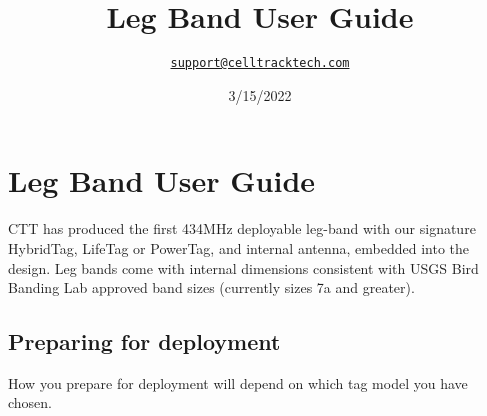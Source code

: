 \documentclass[
]{article}
\title{Leg Band User Guide}
\author{\href{mailto:support@celltracktech.com}{\nolinkurl{support@celltracktech.com}}}
\date{3/15/2022}
\begin{document}
\maketitle

{
\setcounter{tocdepth}{2}
\tableofcontents
}
\hypertarget{leg-band-user-guide}{%
\section{Leg Band User Guide}\label{leg-band-user-guide}}

CTT has produced the first 434MHz deployable leg-band with our signature
HybridTag, LifeTag or PowerTag, and internal antenna, embedded into the
design. Leg bands come with internal dimensions consistent with USGS
Bird Banding Lab approved band sizes (currently sizes 7a and greater).

\hypertarget{preparing-for-deployment}{%
\subsection{Preparing for deployment}\label{preparing-for-deployment}}

How you prepare for deployment will depend on which tag model you have
chosen.
\end{document}
